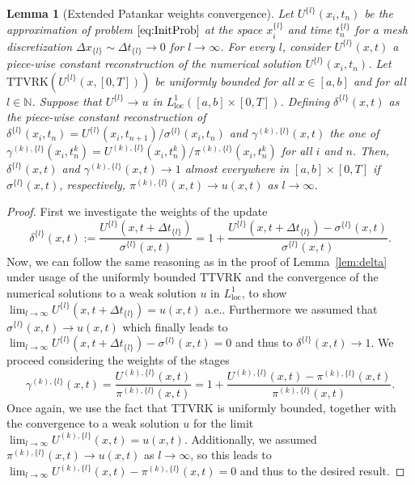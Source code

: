 \documentclass[final,11pt, times, linenumber, nopreprintline]{elsarticle}
\newtheorem{lem}[thm]{Lemma}
\begin{document}
\begin{lem}[Extended Patankar weights convergence]\label{lem:weights_MPRK}
	Let $U^{\{l\}}(x_i,t_n)$ be the approximation of problem $\eqref{eq:InitProb}$ at the space $x^{\{l\}}_i$ and time $t_n^{\{l\}}$ for a mesh discretization $\Delta x_{\{l\}}\sim \Delta t_{\{l\}}\to 0$ for $l\to \infty$. For every $l$, consider $U^{\{l\}}(x,t)$ a piece-wise constant reconstruction of the numerical solution $U^{\{l\}}(x_i,t_n)$. Let $\text{TTVRK}(U^{\{l\}}(x,[0,T]))$ be uniformly bounded for all $x\in [a,b]$ and for all $l\in \mathbb N$. Suppose that $U^{\{l\}}\to u$ in $L^1_{\text{loc}}([a,b]\times [0,T] )$. Defining $\delta^{\{l\}}(x,t)$ as the piece-wise constant reconstruction of $\delta^{\{l\}}(x_i,t_n)=U^{\{l\}}(x_i,t_{n+1})/\sigma^{\{l\}}(x_i,t_n)$ and $\gamma^{(k),\{l\}}(x,t)$ the one of $\gamma^{(k),\{l\}}(x_i,t_n^k)=U^{(k),\{l\}}(x_i,t_{n}^k)/\pi^{(k),\{l\}}(x_i,t_n^k)$ for all $i$ and $n$. Then, $\delta^{\{l\}}(x,t)$ and $\gamma^{(k),\{l\}}(x,t) \to 1$ almost everywhere in $[a,b]\times [0,T]$ if $\sigma^{\{l\}}(x,t)$, respectively, $\pi^{(k),\{l\}}(x, t) \rightarrow u(x,t)$ as $l\to\infty$.
\end{lem}

\begin{proof}
First we investigate the weights of the update
$$\delta^{\{l\}}(x,t):= \frac{U^{\{l\}}(x,t+\Delta t_{\{l\}})}{\sigma^{\{l\}}(x,t)}=1+\frac{U^{\{l\}}(x,t+\Delta t_{\{l\}})-\sigma^{\{l\}}(x,t)}{\sigma^{\{l\}}(x,t)}.$$ 
	Now, we can follow the same reasoning as in the proof of Lemma~\ref{lem:delta} under usage of the uniformly bounded TTVRK and the convergence of the numerical solutions to a weak solution $u$ in $L^1_{\text{loc}}$, to show $\lim_{l\to\infty} U^{\{l\}}(x,t+\Delta t_{\{l\}})=u(x,t)$ a.e.. Furthermore we assumed that $\sigma^{\{l\}}(x,t) \rightarrow  u(x,t)$ which finally leads to $\lim_{l\to\infty} U^{\{l\}}(x,t+\Delta t_{\{l\}})-\sigma^{\{l\}}(x,t) = 0$ and thus to $\delta^{\{l\}}(x,t) \rightarrow 1$.
We proceed considering the weights of the stages
$$\gamma^{(k),\{l\}}(x,t)=\frac{U^{(k),\{l\}}(x,t)}{\pi^{(k),\{l\}}(x,t)} = 1 + \frac{U^{(k),\{l\}}(x,t)-\pi^{(k),\{l\}}(x,t)}{\pi^{(k),\{l\}}(x,t)}.$$
Once again, we use the fact that TTVRK is uniformly bounded, together with the convergence to a weak solution $u$ for the limit $\lim_{l\to\infty} U^{(k),\{l\}}(x,t)=u(x,t)$. 
Additionally, we assumed $\pi^{(k),\{l\}}(x, t) \rightarrow u(x,t)$ as $l\to\infty$, so this leads to $\lim_{l\to\infty} U^{(k),\{l\}}(x,t)-\pi^{(k),\{l\}}(x,t) = 0$ and thus to the desired result.
\end{proof}
\end{document}
